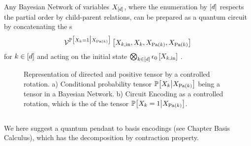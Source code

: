 \begin{theorem}[Low et al.]
    Any Bayesian Network of variables $X_{[d]}$, where the enumeration by $[d]$ respects the partial order by child-parent relations, can be prepared as a quantum circuit by concatenating the \activationCircuit{}s
    \begin{align*}
        \mathcal{V}^{
            \mathbb{P}\big[X_{k}=1\big|X_{\mathrm{Pa}(k)}\big]
        }\left[X_{k,\mathrm{in}},X_{k},X_{\mathrm{Pa}(k)},X_{\mathrm{Pa}(k)}\right]
    \end{align*}
    for $k\in[d]$ and acting on the initial state $\bigotimes_{k\in[d]}\epsilon_{0}\left[X_{k,\mathrm{in}}\right]$ .
\end{theorem}



\begin{figure}
    \begin{center}
        
    \end{center}
    \caption{
        Representation of directed and positive tensor by a controlled rotation.
        a) Conditional probability tensor $\mathbb{P}\big[X_{k}\big|X_{\mathrm{Pa}(k)}\big]$ being a tensor in a Bayesian Network.
        b) Circuit Encoding as a controlled rotation, which is the \ActivationCircuit{} of the tensor $\mathbb{P}\big[X_{k}=1\big|X_{\mathrm{Pa}(k)}\big]$.
    }\label{fig:cpdEncoding}
\end{figure}

\subsection{\ComputationCircuits{}}

We here suggest a quantum pendant to basis encodings (see Chapter Basis Calculus), which has the decomposition by contraction property.

